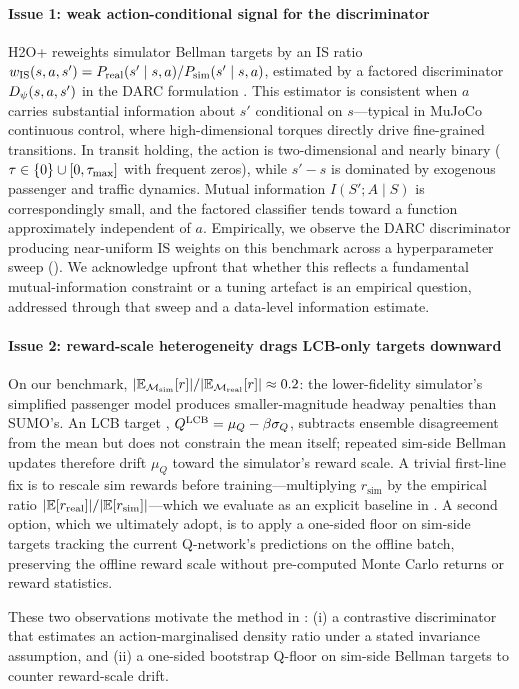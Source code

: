 \paragraph{Issue 1: weak action-conditional signal for the discriminator}
H2O+ reweights simulator Bellman targets by an IS ratio $w_{\mathrm{IS}}(s,a,s') = P_{\mathrm{real}}(s'\mid s,a)/P_{\mathrm{sim}}(s'\mid s,a)$, estimated by a factored discriminator $D_\psi(s,a,s')$ in the DARC formulation \citep{eysenbach2021off}.
This estimator is consistent when $a$ carries substantial information about $s'$ conditional on $s$---typical in MuJoCo continuous control, where high-dimensional torques directly drive fine-grained transitions.
In transit holding, the action is two-dimensional and nearly binary ($\tau \in \{0\} \cup [0, \tau_{\max}]$ with frequent zeros), while $s' - s$ is dominated by exogenous passenger and traffic dynamics.
Mutual information $I(S'; A \mid S)$ is correspondingly small, and the factored classifier tends toward a function approximately independent of $a$.
Empirically, we observe the DARC discriminator producing near-uniform IS weights on this benchmark across a hyperparameter sweep ().
We acknowledge upfront that whether this reflects a fundamental mutual-information constraint or a tuning artefact is an empirical question, addressed through that sweep and a data-level information estimate.

\paragraph{Issue 2: reward-scale heterogeneity drags LCB-only targets downward}
On our benchmark, $\lvert\mathbb{E}_{\mathcal{M}_{\mathrm{sim}}}[r]\rvert / \lvert\mathbb{E}_{\mathcal{M}_{\mathrm{real}}}[r]\rvert \approx 0.2$: the lower-fidelity simulator's simplified passenger model produces smaller-magnitude headway penalties than SUMO's.
An LCB target \citep{an2021uncertainty}, $Q^{\mathrm{LCB}} = \mu_Q - \beta \sigma_Q$, subtracts ensemble disagreement from the mean but does not constrain the mean itself; repeated sim-side Bellman updates therefore drift $\mu_Q$ toward the simulator's reward scale.
A trivial first-line fix is to rescale sim rewards before training---multiplying $r_{\text{sim}}$ by the empirical ratio $\lvert\mathbb{E}[r_{\text{real}}]\rvert / \lvert\mathbb{E}[r_{\text{sim}}]\rvert$---which we evaluate as an explicit baseline in .
A second option, which we ultimately adopt, is to apply a one-sided floor on sim-side targets tracking the current Q-network's predictions on the offline batch, preserving the offline reward scale without pre-computed Monte Carlo returns or reward statistics.

\medskip

These two observations motivate the method in : (i) a contrastive discriminator that estimates an action-marginalised density ratio under a stated invariance assumption, and (ii) a one-sided bootstrap Q-floor on sim-side Bellman targets to counter reward-scale drift.

